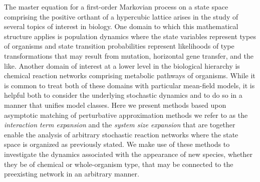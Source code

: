 The master equation for a first-order Markovian process on a state space comprising the positive orthant of a hypercubic lattice arises in the study of several topics of interest in biology. One domain to which this mathematical structure applies is population dynamics where the state variables represent types of organisms and state transition probabilities represent likelihoods of type transformations that may result from mutation, horizontal gene transfer, and the like. Another domain of interest at a lower level in the biological hierarchy is chemical reaction networks comprising metabolic pathways of organisms. While it is common to treat both of these domains with particular mean-field models, it is helpful both to consider the underlying stochastic dynamics and to do so in a manner that unifies model classes. Here we present methods based upon asymptotic matching of perturbative approximation methods we refer to as the \emph{interaction term expansion} and the \emph{system size expansion} that are together enable the analysis of arbitrary stochastic reaction networks where the state space is organized as previously stated. We make use of these methods to investigate the dynamics associated with the appearance of new species, whether they be of chemical or whole-organism type, that may be connected to the preexisting network in an arbitrary manner.
